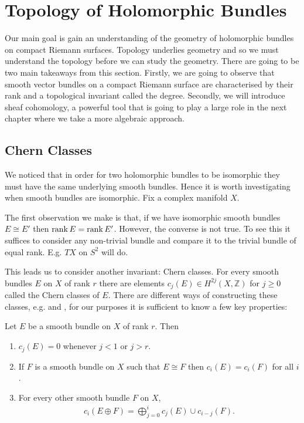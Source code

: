 \documentclass[12pt]{ociamthesis}  %
\begin{document}
\section{Topology of Holomorphic Bundles}

Our main goal is gain an understanding of the geometry of
holomorphic bundles on compact Riemann surfaces. Topology underlies
geometry and so we must understand the topology before we can study
the geometry. There are going to be two main takeaways from this
section. Firstly, we are going to observe that smooth vector
bundles on a compact Riemann surface are characterised by their
rank and a topological invariant called the degree. Secondly, we
will introduce sheaf cohomology, a powerful tool that is going to
play a large role in the next chapter where we take a more
algebraic approach.

\subsection{Chern Classes}

We noticed that in order for two holomorphic bundles to be isomorphic
they must have the same underlying smooth bundles. Hence it is worth
investigating when smooth bundles are isomorphic. Fix a complex
manifold $X$.

The first observation we make is that, if we have isomorphic smooth
bundles $E\cong E'$ then $\operatorname{rank} E = \operatorname{rank} E'$. However, the converse
is not true. To see this it suffices to consider any non-trivial
bundle and compare it to the trivial bundle of equal rank. E.g.
$TX$ on $S^2$ will do.

This leads us to consider another invariant: Chern classes. For
every smooth bundles $E$ on $X$ of rank $r$ there are elements
$c_j(E)\in H^{2j}(X,\mathbb{Z})$ for $j\geq 0$ called the Chern
classes of $E$. There are different ways of constructing these classes,
e.g. \cite{fine2013} and \cite{griffiths1994}, for our purposes
it is sufficient to know a few key properties:

\begin{lemma}\missingcitation
  Let $E$ be a smooth bundle on $X$ of rank $r$. Then
  \begin{enumerate}
    \item $c_j(E) = 0$ whenever $j<1$ or $j>r$.
    \item If $F$ is a smooth bundle on $X$ such that $E\cong F$
      then $c_i(E) = c_i(F)$ for all $i$.
    \item For every other smooth bundle $F$ on $X$,
      \begin{align*}
        c_i(E\oplus F) = \bigoplus_{j=0}^{i} c_j(E)\cup c_{i-j}(F).
      \end{align*}
  \end{enumerate}
\end{lemma}
\end{document}
